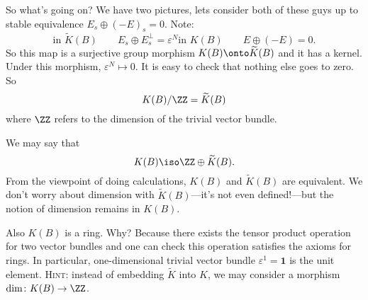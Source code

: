 So what's going on? We have two pictures, 
lets consider both of these guys up to stable equivalence
$E_{s}\oplus(-E)_{s}=0$. Note:
\begin{subequations}
\begin{equation}
\mbox{in $\widetilde{K}(B)$}\qquad E_{s}\oplus
E_{s}^{\bot}=\varepsilon^{N}
\end{equation}
\begin{equation}
\mbox{in $K(B)$}\qquad E\oplus(-E)=0.
\end{equation}
\end{subequations}
So this map is a surjective group morphism
$K(B)\onto\widetilde{K}(B)$ and it has a kernel. Under this
morphism, $\varepsilon^N\mapsto0$. It is easy to check that
nothing else goes to zero. So
\begin{equation}
K(B)/\ZZ=\widetilde{K}(B)
\end{equation}
where $\ZZ$ refers to the dimension of the trivial vector bundle.

We may say that
\begin{equation}
K(B)\iso \ZZ\oplus\widetilde{K}(B).
\end{equation}
From the viewpoint of doing calculations, $K(B)$ and
$\widetilde{K}(B)$ are equivalent. We don't worry about dimension
with $\widetilde{K}(B)$---it's not even defined!---but the notion
of dimension remains in $K(B)$.

Also $K(B)$ is a ring. Why? Because there exists the tensor
product operation for two vector bundles and one can check this
operation satisfies the axioms for rings. In particular,
one-dimensional trivial vector bundle
$\varepsilon^{1}=\mathbf{1}$ is the unit element. \textsc{Hint:}
instead of embedding $\widetilde{K}$ into $K$, we may consider a
morphism $\dim\colon K(B)\to\ZZ$.

